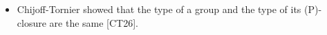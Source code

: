 \documentclass[preview]{standalone}
\begin{document}
\begin{center}
\begin{itemize} \item Chijoff-Tornier showed that the type of a group and the type of its (P)-closure are the same [CT26].\end{itemize}
\end{center}
\end{document}
